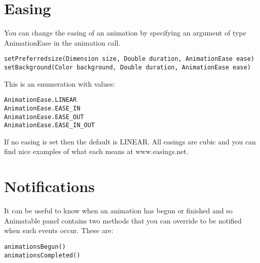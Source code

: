 \documentclass[a4paper, 12pt]{article}
\begin{document}
\section{Easing}
You can change the easing of an animation by specifying an argument of type AnimationEase in the animation call.\\
\begin{lstlisting}
setPreferredsize(Dimension size, Double duration, AnimationEase ease)
setBackground(Color background, Double duration, AnimationEase ease)
\end{lstlisting}
This is an enumeration with values:\\
\begin{lstlisting}
AnimationEase.LINEAR
AnimationEase.EASE_IN
AnimationEase.EASE_OUT
AnimationEase.EASE_IN_OUT
\end{lstlisting}
If no easing is set then the default is LINEAR. All easings are cubic and you can find nice examples of what each means at www.easings.net.\\
\section{Notifications}
It can be useful to know when an animation has begun or finished and so Animatable panel contains two methods that you can override to be notified when such events occur. These are: \begin{lstlisting}
animationsBegun()
animationsCompleted()
\end{lstlisting}
\end{document}
